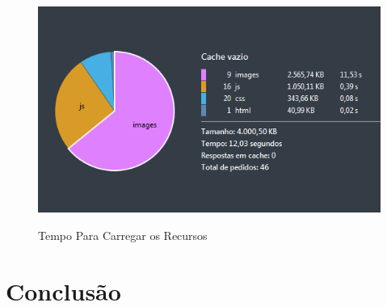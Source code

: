 \begin{figure}[ht]
	\centering	
	\caption[\hspace{0.1cm}Imagens Clínicas.]{Tempo Para Carregar os Recursos}
	\vspace{-0.4cm}
	\includegraphics[width=.7\textwidth]{figuras/analiseTempoIndividualParaCarregarImagens.png}
	\vspace{-0.2cm}
	\label{fig:figura7}
\end{figure}

\section{\esp Conclusão}



% 
